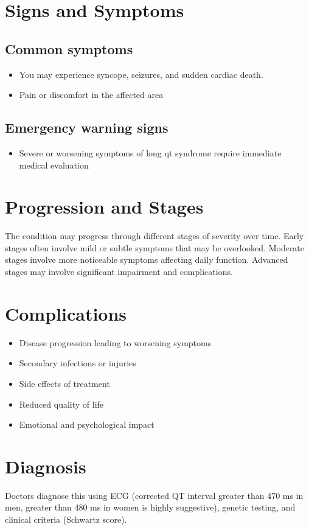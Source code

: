\section{Signs and Symptoms}

\subsection{Common symptoms}
\begin{itemize}[noitemsep]
  \item You may experience syncope, seizures, and sudden cardiac death.
  \item Pain or discomfort in the affected area
  \end{itemize}

\subsection{Emergency warning signs}
\begin{itemize}[noitemsep]
  \item Severe or worsening symptoms of long qt syndrome require immediate medical evaluation
\end{itemize}
\section{Progression and Stages}
The condition may progress through different stages of severity over time. Early stages often involve mild or subtle symptoms that may be overlooked. Moderate stages involve more noticeable symptoms affecting daily function. Advanced stages may involve significant impairment and complications.
\section{Complications}
\begin{itemize}[noitemsep]
  \item Disease progression leading to worsening symptoms
  \item Secondary infections or injuries
  \item Side effects of treatment
  \item Reduced quality of life
  \item Emotional and psychological impact
\end{itemize}
\section{Diagnosis}
Doctors diagnose this using ECG (corrected QT interval greater than 470 ms in men, greater than 480 ms in women is highly suggestive), genetic testing, and clinical criteria (Schwartz score).

